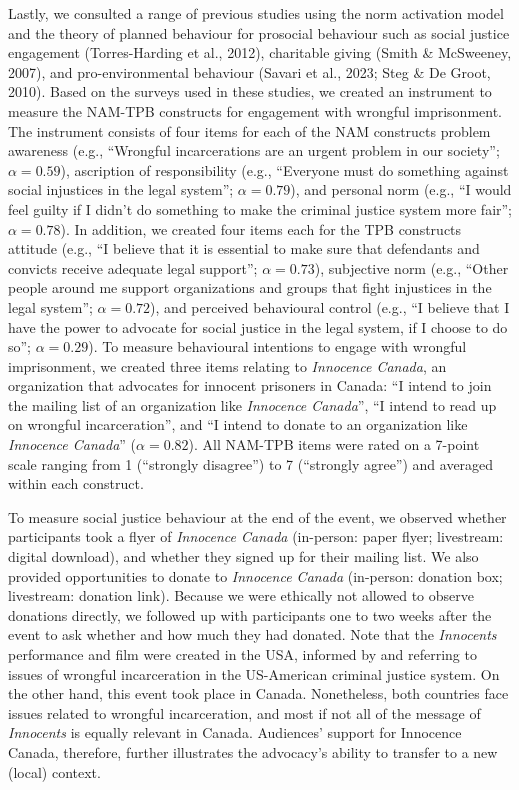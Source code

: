 \documentclass[
  man,floatsintext]{apa6}
\begin{document}
Lastly, we consulted a range of previous studies using the norm activation model and the theory of planned behaviour for prosocial behaviour such as social justice engagement (Torres-Harding et al., 2012), charitable giving (Smith \& McSweeney, 2007), and pro-environmental behaviour (Savari et al., 2023; Steg \& De Groot, 2010). Based on the surveys used in these studies, we created an instrument to measure the NAM-TPB constructs for engagement with wrongful imprisonment. The instrument consists of four items for each of the NAM constructs problem awareness (e.g., ``Wrongful incarcerations are an urgent problem in our society''; \(\alpha = 0.59\)), ascription of responsibility (e.g., ``Everyone must do something against social injustices in the legal system''; \(\alpha = 0.79\)), and personal norm (e.g., ``I would feel guilty if I didn't do something to make the criminal justice system more fair''; \(\alpha = 0.78\)). In addition, we created four items each for the TPB constructs attitude (e.g., ``I believe that it is essential to make sure that defendants and convicts receive adequate legal support''; \(\alpha = 0.73\)), subjective norm (e.g., ``Other people around me support organizations and groups that fight injustices in the legal system''; \(\alpha = 0.72\)), and perceived behavioural control (e.g., ``I believe that I have the power to advocate for social justice in the legal system, if I choose to do so''; \(\alpha = 0.29\)). To measure behavioural intentions to engage with wrongful imprisonment, we created three items relating to \textit{Innocence Canada}, an organization that advocates for innocent prisoners in Canada: ``I intend to join the mailing list of an organization like \textit{Innocence Canada}'', ``I intend to read up on wrongful incarceration'', and ``I intend to donate to an organization like \textit{Innocence Canada}'' (\(\alpha = 0.82\)). All NAM-TPB items were rated on a 7-point scale ranging from 1 (``strongly disagree'') to 7 (``strongly agree'') and averaged within each construct.

To measure social justice behaviour at the end of the event, we observed whether participants took a flyer of \textit{Innocence Canada} (in-person: paper flyer; livestream: digital download), and whether they signed up for their mailing list. We also provided opportunities to donate to \textit{Innocence Canada} (in-person: donation box; livestream: donation link). Because we were ethically not allowed to observe donations directly, we followed up with participants one to two weeks after the event to ask whether and how much they had donated. Note that the \textit{Innocents} performance and film were created in the USA, informed by and referring to issues of wrongful incarceration in the US-American criminal justice system. On the other hand, this event took place in Canada. Nonetheless, both countries face issues related to wrongful incarceration, and most if not all of the message of \textit{Innocents} is equally relevant in Canada. Audiences' support for Innocence Canada, therefore, further illustrates the advocacy's ability to transfer to a new (local) context.
\end{document}
